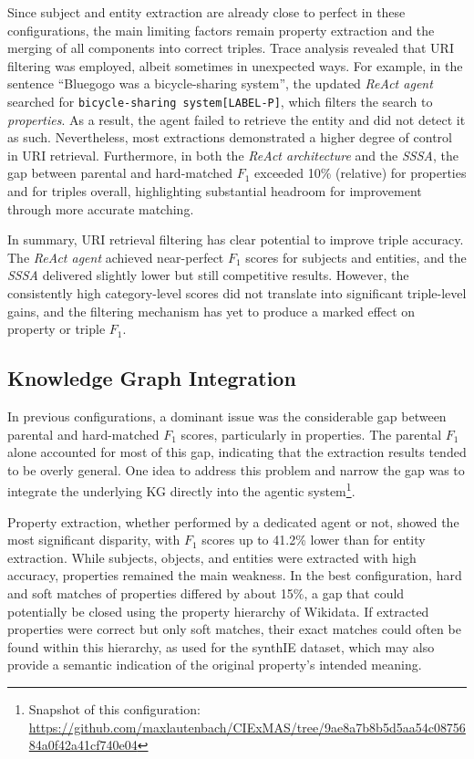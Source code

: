 \documentclass[a4paper,oneside,bibliography=totoc]{scrbook}
\begin{document}
Since subject and entity extraction are already close to perfect in these configurations, the main limiting factors remain property extraction and the merging of all components into correct triples. Trace analysis revealed that \ac{URI} filtering was employed, albeit sometimes in unexpected ways. For example, in the sentence \enquote{Bluegogo was a bicycle-sharing system}, the updated \textit{\ac{ReAct} agent} searched for \texttt{bicycle-sharing system[LABEL-P]}, which filters the search to \textit{properties}. As a result, the agent failed to retrieve the entity and did not detect it as such. Nevertheless, most extractions demonstrated a higher degree of control in \ac{URI} retrieval. Furthermore, in both the \textit{\ac{ReAct} architecture} and the \textit{\ac{SSSA}}, the gap between parental and hard-matched $F_{1}$ exceeded 10\% (relative) for properties and for triples overall, highlighting substantial headroom for improvement through more accurate matching.

In summary, \ac{URI} retrieval filtering has clear potential to improve triple accuracy. The \textit{\ac{ReAct} agent} achieved near-perfect $F_{1}$ scores for subjects and entities, and the \textit{\ac{SSSA}} delivered slightly lower but still competitive results. However, the consistently high category-level scores did not translate into significant triple-level gains, and the filtering mechanism has yet to produce a marked effect on property or triple $F_{1}$.

\subsection{Knowledge Graph Integration}
\label{subsec:knowledge_graph_integration}

In previous configurations, a dominant issue was the considerable gap between parental and hard-matched $F_{1}$ scores, particularly in properties. The parental $F_{1}$ alone accounted for most of this gap, indicating that the extraction results tended to be overly general. One idea to address this problem and narrow the gap was to integrate the underlying \ac{KG} directly into the agentic system\footnote{Snapshot of this configuration: \url{https://github.com/maxlautenbach/CIExMAS/tree/9ae8a7b8b5d5aa54c0875684a0f42a41cf740e04}}.

Property extraction, whether performed by a dedicated agent or not, showed the most significant disparity, with $F_{1}$ scores up to 41.2\% lower than for entity extraction. While subjects, objects, and entities were extracted with high accuracy, properties remained the main weakness. In the best configuration, hard and soft matches of properties differed by about 15\%, a gap that could potentially be closed using the property hierarchy of Wikidata. If extracted properties were correct but only soft matches, their exact matches could often be found within this hierarchy, as used for the synthIE dataset, which may also provide a semantic indication of the original property's intended meaning.
\end{document}
